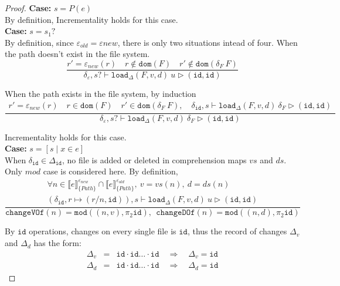 \documentclass[10pt,twoside,a4paper]{article}
\theoremstyle{theorem}
\theoremstyle{lemma}
\theoremstyle{property}
\theoremstyle{definition}
\theoremstyle{assumption}
\def\snd{\pi_2}
\def\id{\mathtt{id}}
\begin{document}
\begin{proof}
	\textbf{Case: } $s = P(e)$\\

		By definition, Incrementality holds for this case.\\

	\textbf{Case: } $s = s_1?$\\

	By definition, since $\varepsilon_{old} = \varepsilon{new}$, there is only two situations intead of four. When the path doesn't exist in the file system.
	\begin{displaymath}
	\frac{
		r' = \varepsilon_{new}(r) \quad r \notin \mathtt{dom}(F) \quad r' \notin \mathtt{dom}(\delta_F~F)
	}
	{\delta_\varepsilon, s? \vdash \mathtt{load}_\Delta (F,v,d)~ u \rhd (\mathtt{id}, \mathtt{id})}
	\end{displaymath}

	When the path exists in the file system, by induction
	\begin{displaymath}
	\frac{\begin{array}{c}
	r' = \varepsilon_{new}(r) \quad r \in \mathtt{dom}(F) \quad r' \in \mathtt{dom}(\delta_F~F), \quad
		\delta_{\id}, s \vdash \mathtt{load}_\Delta (F,v,d)~ \delta_F \rhd (\id, \id)
	\end{array}}
	{\delta_\varepsilon, s? \vdash \mathtt{load}_\Delta (F,v,d)~ \delta_F \rhd (\id,\id)}
	\end{displaymath}

	Incrementality holds for this case.\\

	\textbf{Case: } $s = [ s \mid x \in e]$\\

	When $\delta_{\id} \in \Delta_{\id}$, no file is added or deleted in comprehension maps $vs$ and $ds$. Only $mod$ case is considered here. By definition,
	\begin{displaymath}
		\frac{\begin{array}{c}
		\forall n \in \llbracket e \rrbracket^{\varepsilon_{new}}_{\{Path\}} \cap \llbracket e \rrbracket^{\varepsilon_{old}}_{\{Path\}}, ~ v = vs(n), ~d = ds(n)\\
		(\delta_{\id}, r \mapsto (r/n, \id)), s \vdash \mathtt{load}_\Delta (F,v,d)~ u \rhd (\id,\id)
		\end{array}}
		{\mathtt{changeVOf}(n) = \mathtt{mod}((n,v), \snd\id), ~~\mathtt{changeDOf}(n) = \mathtt{mod}((n,d), \snd\id)}
	\end{displaymath}

	By $\id$ operations, changes on every single file is $\id$, thus the record of changes $\Delta_v$ and $\Delta_d$ has the form:
	\begin{eqnarray*}
		\Delta_v &=& \id \cdot \id \dots \cdot \id \quad \Rightarrow \quad \Delta_v = \id\\
		\Delta_d &=& \id \cdot \id \dots \cdot \id \quad \Rightarrow \quad \Delta_d = \id
	\end{eqnarray*}


\end{proof}
\end{document}
